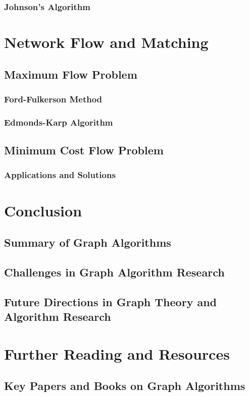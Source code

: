 \documentclass[12pt]{book} %
\begin{document}
\subsubsection{Johnson's Algorithm}

\section{Network Flow and Matching}
\subsection{Maximum Flow Problem}
\subsubsection{Ford-Fulkerson Method}
\subsubsection{Edmonds-Karp Algorithm}
\subsection{Minimum Cost Flow Problem}
\subsubsection{Applications and Solutions}

\section{Conclusion}
\subsection{Summary of Graph Algorithms}
\subsection{Challenges in Graph Algorithm Research}
\subsection{Future Directions in Graph Theory and Algorithm Research}

\section{Further Reading and Resources}
\subsection{Key Papers and Books on Graph Algorithms}
\end{document}
